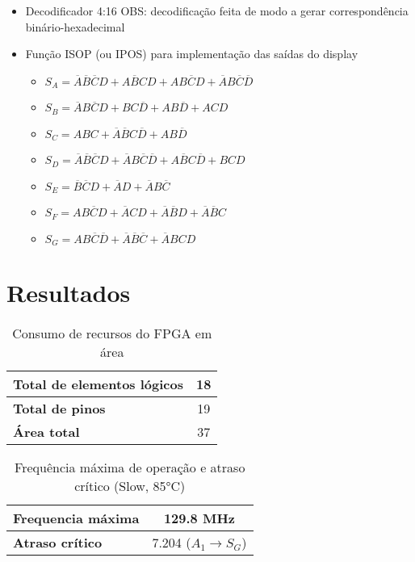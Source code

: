 \documentclass[12pt, fleqn]{article}
\begin{document}
\begin{itemize}
    \item Decodificador 4:16
    \newline
        OBS: decodificação feita de modo a gerar correspondência binário-hexadecimal
    \item Função ISOP (ou IPOS) para implementação das saídas do display
    \begin{itemize}
        \item $S_{A}=\overline{A}\overline{B}\overline{C}D+A\overline{B}CD+AB\overline{C}D+\overline{A}B\overline{C}\overline{D}$
        \item $S_{B}=\overline{A}B\overline{C}D+BC\overline{D}+AB\overline{D}+ACD$
        \item $S_{C}=ABC+\overline{A}\overline{B}C\overline{D}+AB\overline{D}$
        \item $S_{D}=\overline{A}\overline{B}\overline{C}D+\overline{A}B\overline{C}\overline{D}+A\overline{B}C\overline{D}+BCD$
        \item $S_{E}=\overline{B}\overline{C}D+\overline{A}D+\overline{A}B\overline{C}$
        \item $S_{F}=AB\overline{C}D+\overline{A}CD+\overline{A}\overline{B}D+\overline{A}\overline{B}C$
        \item $S_{G}=AB\overline{C}\overline{D}+\overline{A}\overline{B}\overline{C}+\overline{A}BCD$
    \end{itemize}
\end{itemize}

\section{Resultados}

\begin{table}[H]
    \centering
    \begin{tabular}{|l | c|}
        \hline
        \textbf{Total de elementos lógicos} & 18 \\
        \hline
        \textbf{Total de pinos} & 19 \\
        \hline
        \textbf{Área total} & 37 \\
        \hline
    \end{tabular}
    \caption{Consumo de recursos do FPGA em área}
\end{table}

\begin{table}[H]
    \centering
    \begin{tabular}{|l | c|}
        \hline
        \textbf{Frequencia máxima} & 129.8 MHz \\
        \hline
        \textbf{Atraso crítico} & 7.204 ($A_1 \to S_G$) \\
        \hline
    \end{tabular}
    \caption{Frequência máxima de operação e atraso crítico (Slow, 85°C)}
\end{table}
\end{document}
